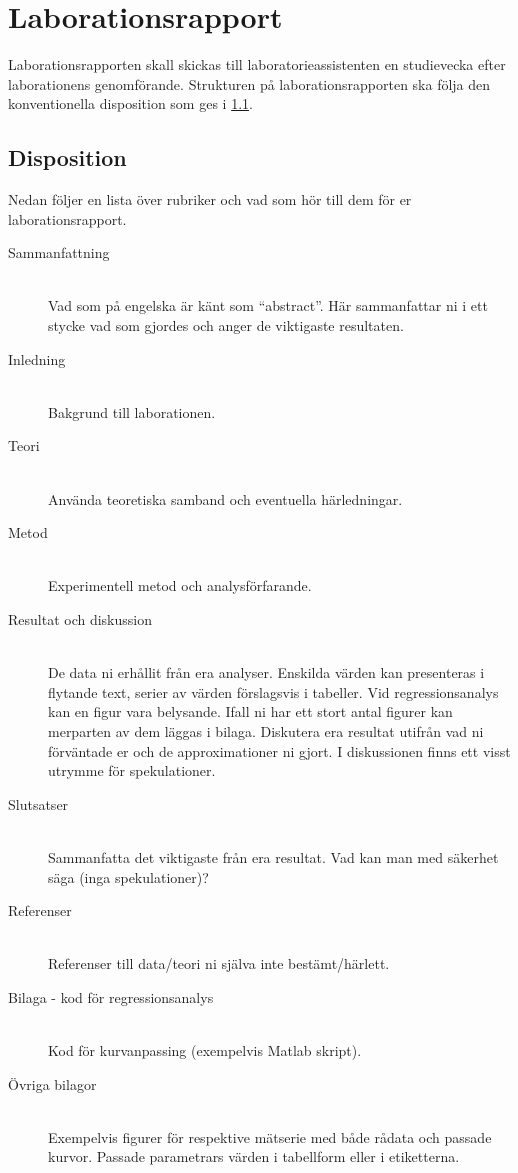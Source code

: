 \section{Laborationsrapport}
\label{sec:rapport}
Laborationsrapporten skall skickas till laboratorieassistenten en
studievecka efter laborationens genomförande. Strukturen på
laborationsrapporten ska följa den konventionella disposition som ges i 
\cref{sec:rapport-disposition}.

\subsection{Disposition}
\label{sec:rapport-disposition}
Nedan följer en lista över rubriker och vad som hör till dem för er
laborationsrapport. 
\begin{description}
  \item[Sammanfattning] \hfill \\
    Vad som på engelska är känt som ``abstract''. Här sammanfattar ni i
    ett stycke vad som gjordes och anger de viktigaste resultaten.
  \item[Inledning] \hfill \\ 
    Bakgrund till laborationen.
  \item[Teori] \hfill \\ 
    Använda teoretiska samband och eventuella härledningar.
  \item[Metod] \hfill \\ 
    Experimentell metod och analysförfarande.
  \item[Resultat och diskussion] \hfill \\ 
    De data ni erhållit från era analyser. Enskilda värden kan
    presenteras i flytande text, serier av värden förslagsvis i tabeller.
    Vid regressionsanalys kan en figur vara belysande. Ifall ni har
    ett stort antal figurer kan merparten av dem läggas i
    bilaga. Diskutera era resultat utifrån vad ni förväntade er och de
    approximationer ni gjort. I diskussionen finns ett visst utrymme för
    spekulationer.
  \item[Slutsatser] \hfill \\ 
    Sammanfatta det viktigaste från era resultat. Vad kan man med säkerhet
    säga (inga spekulationer)?
  \item[Referenser] \hfill \\
    Referenser till data/teori ni själva inte bestämt/härlett.
  \item[Bilaga - kod för regressionsanalys] \hfill \\
    Kod för kurvanpassing (exempelvis Matlab skript).
  \item[Övriga bilagor] \hfill \\
    Exempelvis figurer för respektive mätserie med både rådata och
    passade kurvor. Passade parametrars värden i tabellform eller i
    etiketterna.
\end{description}

